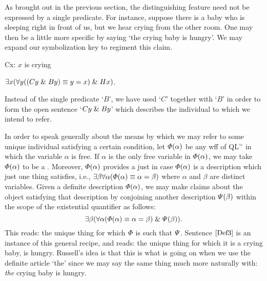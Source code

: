 As brought out in the previous section, the distinguishing feature need not be expressed by a single predicate.
For instance, suppose there is a baby who is sleeping right in front of us, but we hear crying from the other room.
One may then be a little more specific by saying `the crying baby is hungry'.
We may expand our symbolization key to regiment this claim.

\begin{multicols}{2}

\begin{ekey}
  \item[Cx:] $x$ is crying
\end{ekey}

\begin{earg}
  \item[\ex{Def3}] $\exists x (\forall y ((Cy \mathrel\& By) \equiv y = x) \mathrel\& Hx)$.
\end{earg}

\end{multicols}

Instead of the single predicate `$B$', we have used `$C$' together with `$B$' in order to form the open sentence `$Cy \mathrel\& By$' which describes the individual to which we intend to refer.

In order to speak generally about the means by which we may refer to some unique individual satisfying a certain condition, let $\varPhi(\alpha)$ be any wff of QL$^=$ in which the variable $\alpha$ is free. 
If $\alpha$ is the only free variable in $\varPhi(\alpha)$, we may take $\varPhi(\alpha)$ to be a .
Moreover, $\varPhi(\alpha)$ provides a  just in case $\varPhi(\alpha)$ is a description which just one thing satisfies, i.e., $\exists \beta\forall \alpha(\varPhi(\alpha)\equiv \alpha = \beta)$ where $\alpha$ and $\beta$ are distinct variables.
Given a definite description $\varPhi(\alpha)$, we may make claims about the object satisfying that description by conjoining another description $\varPsi(\beta)$ within the scope of the existential quantifier as follows: 
  $$\exists \beta(\forall \alpha(\varPhi(\alpha)\equiv \alpha = \beta) \mathrel\& \varPsi(\beta)).$$
This reads: the unique thing for which $\varPhi$ is such that $\varPsi$.
Sentence $\ref{Def3}$ is an instance of this general recipe, and reads: the unique thing for which it is a crying baby, is hungry. 
Russell's idea is that this is what is going on when we use the definite article `the' since we may say the same thing much more naturally with: \textit{the} crying baby is hungry.

